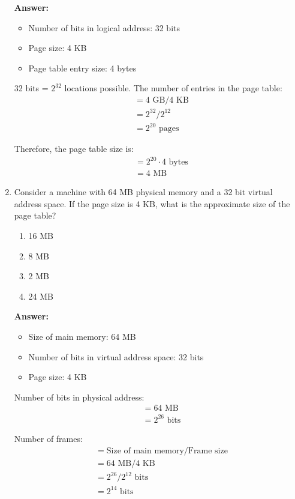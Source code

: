 \documentclass[12pt]{article}
\newcommand{\answeritem}{\global\answertrue\item}
\newcommand{\perhapsanswer}{%
  \ifanswer
    $\blacksquare$ \global\answerfalse
  \else
    $\square$ \global\answerfalse
  \fi
}
\newif\ifanswer
\begin{document}
\begin{enumerate}
  \textbf{Answer:}
  \begin{itemize}
    \item Number of bits in logical address: 32 bits
    \item Page size: 4 KB
    \item Page table entry size: 4 bytes
  \end{itemize}

  32 bits = $2^{32}$ locations possible. The number of entries in the page table:
  \begin{align*}
    &= 4 \text{ GB} / 4 \text{ KB}\\
    &= 2^{32} / 2^{12}\\
    &= 2^{20} \text{ pages}
  \end{align*}

  Therefore, the page table size is:
  \begin{align*}
    &= 2^{20} \cdot 4 \text{ bytes} \\
    &= 4 \text{ MB}
  \end{align*}

  \item Consider a machine with 64 MB physical memory and a 32 bit virtual address space. If the page size is 4 KB, what is the approximate size of the page table?

  \begin{enumerate}[start=1,align=left,label={\protect\perhapsanswer(\alph*)}]
    \item 16 MB
    \item 8 MB
    \answeritem 2 MB
    \item 24 MB
  \end{enumerate}

  \textbf{Answer:}
  \begin{itemize}
    \item Size of main memory: 64 MB
    \item Number of bits in virtual address space: 32 bits
    \item Page size: 4 KB
  \end{itemize}

  Number of bits in physical address:
  \begin{align*}
    &= 64 \text{ MB}\\
    &= 2^{26} \text{ bits}
  \end{align*}

  Number of frames:
  \begin{align*}
    &= \text{Size of main memory} / \text{Frame size} \\
    &= 64 \text{ MB} / 4 \text{ KB} \\
    &= 2^{26} / 2^{12} \text{ bits} \\
    &= 2^{14} \text{ bits}
  \end{align*}


\end{enumerate}
\end{document}
